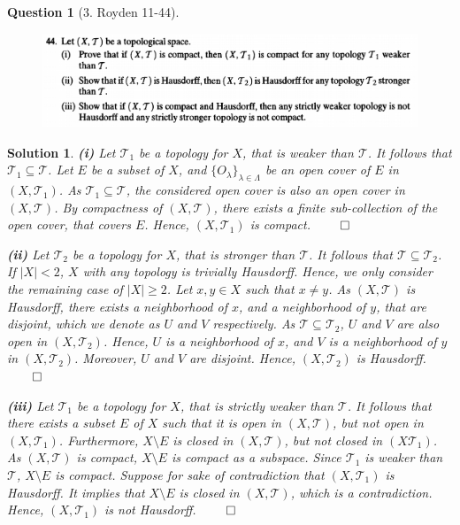 \documentclass{article} %
\theoremstyle{quest}
\newtheorem*{question}{Question}
\newtheorem*{solution}{Solution}
\begin{document}
\begin{question}[3. Royden 11-44]
\hfill
\begin{figure}[h!]
  \centering
    \includegraphics[width=1\textwidth]{11-44}
\end{figure}
\end{question}
\begin{solution} 
\textbf{(i)} 
Let $\mathscr{T}_1$ be a topology for $X$, that is weaker than $\mathscr{T}$.
It follows that $\mathscr{T}_1 \subseteq \mathscr{T}$. Let $E$ be
a subset of $X$, and $\{O_\lambda \}_{\lambda \in \Lambda}$ be 
an open cover of $E$ in $(X,\mathscr{T}_1)$. 
As $\mathscr{T}_1 \subseteq \mathscr{T}$, 
the considered open cover is also an open cover in $(X,\mathscr{T})$. 
By compactness of $(X,\mathscr{T})$, 
there exists a finite sub-collection of the open cover, that covers $E$.
Hence, $(X,\mathscr{T}_1)$ is compact. \hfill $\qed$ 

\smallskip

\textbf{(ii)}
Let $\mathscr{T}_2$ be a topology for $X$, that is stronger than 
$\mathscr{T}$. It follows that $\mathscr{T} \subseteq \mathscr{T}_2$. 
If $|X| < 2$, $X$ with any topology is trivially Hausdorff. Hence,
we only consider the remaining case of $|X| \geq 2$. 
Let $x,y \in X$ such that $x \neq y$. As $(X,\mathscr{T})$ is Hausdorff,
there exists a neighborhood of $x$, and a neighborhood of $y$, that are
disjoint, which we denote as $U$ and $V$ respectively. As 
$\mathscr{T} \subseteq \mathscr{T}_2$, $U$ and $V$ are also open in 
$(X,\mathscr{T}_2)$. Hence, $U$ is a neighborhood of $x$, and $V$
is a neighborhood of $y$ in $(X,\mathscr{T}_2)$. Moreover, $U$ and $V$ are
disjoint. Hence, $(X,\mathscr{T}_2)$ is Hausdorff. \hfill $\qed$
 
\smallskip

\textbf{(iii)} 
Let $\mathscr{T}_1$
be a topology for $X$, that is strictly weaker than $\mathscr{T}$. It follows
that there exists a subset $E$ of $X$ such that it is open in 
$(X,\mathscr{T})$, but not open in $(X,\mathscr{T}_1)$. Furthermore, 
$X \setminus E$ is closed in $(X,\mathscr{T})$, but not closed in
$(X\mathscr{T}_1)$. As $(X,\mathscr{T})$ is compact, $X \setminus E$
is compact as a subspace.
Since $\mathscr{T}_1$ is weaker than $\mathscr{T}$, 
$X\setminus E$ is compact. 
Suppose for sake of contradiction that $(X,\mathscr{T}_1)$
is Hausdorff. It implies that $X \setminus E$ is closed in
$(X,\mathscr{T})$, which is a contradiction. Hence, $(X,\mathscr{T}_1)$
is not Hausdorff. \hfill $\qed$


\end{solution}
\end{document}
